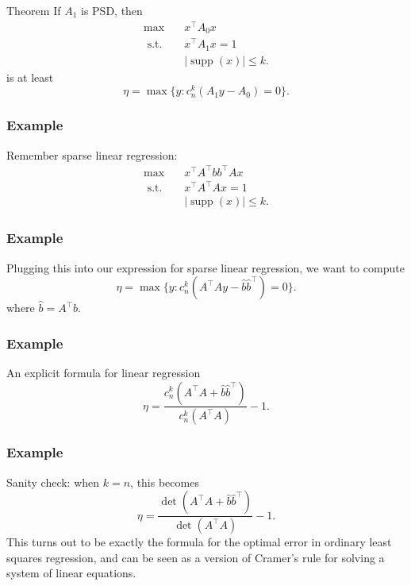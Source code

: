 \documentclass{beamer}
\DeclareMathOperator*{\supp}{supp}
\newcommand{\st}{{\text{ s.t. }}}
\begin{document}
\begin{frame}
    \begin{block}{Theorem}
        If $A_1$ is PSD, then
        \begin{equation*}
            \begin{aligned}
                \max\quad & x^{\intercal}A_0x\\
                \st & x^{\intercal}A_1x = 1\\
                    &|\supp(x)| \le k.
            \end{aligned}
        \end{equation*}
        is at least 
        \[
            \eta = \max \{y : c_n^k(A_1y-A_0) = 0 \}.
        \]
    \end{block}
\end{frame}
\begin{frame}
    \frametitle{Example}
    Remember sparse linear regression:
    \begin{equation*}
        \begin{aligned}
        \max\quad & x^{\intercal}A^{\intercal}bb^{\intercal}Ax\\
        \st & x^{\intercal}A^{\intercal}Ax = 1\\
            & |\supp(x)| \le k.
        \end{aligned}
    \end{equation*}
\end{frame}
\begin{frame}
    \frametitle{Example}
    Plugging this into our expression for sparse linear regression, we want to compute
    \[
        \eta = \max \{y : c_n^k(A^{\intercal}Ay-\hat{b}\hat{b}^{\intercal}) = 0 \}.
    \]
    where $\hat{b} = A^{\intercal}b$.
\end{frame}
\begin{frame}
    \frametitle{Example}
    \begin{block}{An explicit formula for linear regression}
        \[
            \eta = \frac{c_n^k(A^{\intercal}A+\hat{b}\hat{b}^{\intercal})}{c_n^k(A^{\intercal}A)} - 1.
        \]
    \end{block}
\end{frame}
\begin{frame}
    \frametitle{Example}
    Sanity check: when $k = n$, this becomes
    \[
        \eta = \frac{\det(A^{\intercal}A+\hat{b}\hat{b}^{\intercal})}{\det(A^{\intercal}A)} - 1.
    \]
    \pause
    This turns out to be exactly the formula for the optimal error in ordinary least squares regression, and can be seen as a version of Cramer's rule for solving a system of linear equations.
\end{frame}
\end{document}
